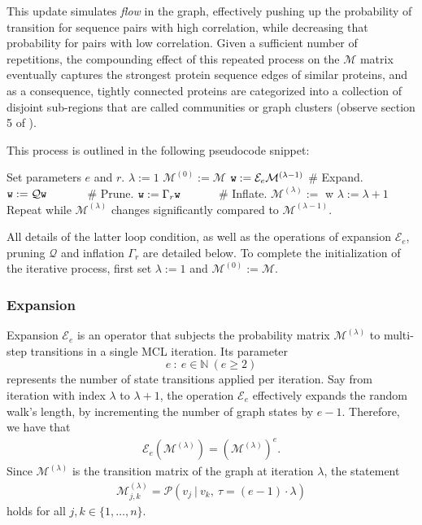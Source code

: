 This update simulates \textit{flow} in the graph, effectively pushing up the
probability of transition for sequence pairs with high correlation, while
decreasing that probability for pairs with low correlation. Given a sufficient
number of repetitions, the compounding effect of this repeated process on the
\(\mathcal{M}\) matrix eventually captures the strongest protein sequence edges
of similar proteins, and as a consequence, tightly connected proteins are
categorized into a collection of disjoint sub-regions that are called
communities or graph clusters (observe section 5 of \cite{mclDetailed}).

This process is outlined in the following pseudocode snippet:
\begin{plaintext}[showspaces=false, literate=]
Set parameters $e$ and $r$.
$\lambda := 1$
$\mathcal{M}^{(0)} := \mathcal{M}$
{
   $\texttt{w} := \mathcal{E}_e \mathcal{M}^{(\lambda-1)} \hspace*{0.00cm}$ # Expand.
   $\texttt{w} := \mathcal{Q} \texttt{w}                  \hspace*{1.121cm}$ # Prune.
   $\texttt{w} := \Gamma_r \texttt{w}                     \hspace*{1.044cm}$ # Inflate.
   $\mathcal{M}^{(\lambda)} := $ w
   $\lambda := \lambda + 1$
} Repeat while $\mathcal{M}^{(\lambda)}$ changes significantly compared to $\mathcal{M}^{(\lambda-1)}$.
\end{plaintext}

All details of the latter loop condition, as well as the operations of expansion \(\mathcal{E}_e\), pruning \(\mathcal{Q}\) and inflation \(\Gamma_r\) are detailed below. To complete the initialization of the iterative process, first set \(\lambda := 1\) and \(\mathcal{M}^{(0)}:=\mathcal{M}\).

\subsubsection{Expansion}

Expansion \(\mathcal{E}_e\) is an operator that subjects the probability matrix \(\mathcal{M}^{(\lambda)}\) to multi-step transitions in a single MCL iteration. Its parameter
\[
  e \ : \ e \in \mathbb{N} \ ( e \geq 2 )
\]
represents the number of state transitions applied per iteration. Say from iteration with index \(\lambda\) to \(\lambda+1\), the operation \(\mathcal{E}_e\) effectively expands the random walk's length, by incrementing the number of graph states by \(e-1\). Therefore, we have that
\begin{align}
  \mathcal{E}_e(\mathcal{M}^{(\lambda)}) = (\mathcal{M}^{(\lambda)})^e.
  \label{eq:expansion}
\end{align}
Since \(\mathcal{M}^{(\lambda)}\) is the transition matrix of the graph at iteration \(\lambda\), the statement
\begin{align}
  \mathcal{M}^{(\lambda)}_{j,k} = \mathcal{P}(v_j \ | \ v_k, \ \tau = (e-1) \cdot \lambda) 
  \label{eq:expProb}
\end{align}
holds for all \(j,k \in \{ 1, \dots, n \}\).

